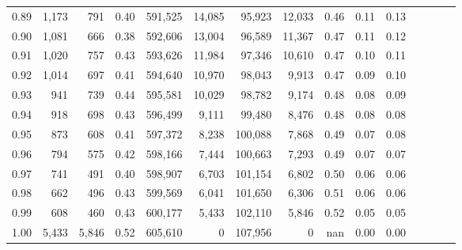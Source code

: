 \begin{tabular}{rrrcrrrrrrrrrrr}
0.89 &   1,173 &    791 &                                       0.40 &  591,525 &   14,085 &   95,923 &   12,033 &  0.46 &  0.11 &                         0.13 \\
0.90 &   1,081 &    666 &                                       0.38 &  592,606 &   13,004 &   96,589 &   11,367 &  0.47 &  0.11 &                         0.12 \\
0.91 &   1,020 &    757 &                                       0.43 &  593,626 &   11,984 &   97,346 &   10,610 &  0.47 &  0.10 &                         0.11 \\
0.92 &   1,014 &    697 &                                       0.41 &  594,640 &   10,970 &   98,043 &    9,913 &  0.47 &  0.09 &                         0.10 \\
0.93 &     941 &    739 &                                       0.44 &  595,581 &   10,029 &   98,782 &    9,174 &  0.48 &  0.08 &                         0.09 \\
0.94 &     918 &    698 &                                       0.43 &  596,499 &    9,111 &   99,480 &    8,476 &  0.48 &  0.08 &                         0.08 \\
0.95 &     873 &    608 &                                       0.41 &  597,372 &    8,238 &  100,088 &    7,868 &  0.49 &  0.07 &                         0.08 \\
0.96 &     794 &    575 &                                       0.42 &  598,166 &    7,444 &  100,663 &    7,293 &  0.49 &  0.07 &                         0.07 \\
0.97 &     741 &    491 &                                       0.40 &  598,907 &    6,703 &  101,154 &    6,802 &  0.50 &  0.06 &                         0.06 \\
0.98 &     662 &    496 &                                       0.43 &  599,569 &    6,041 &  101,650 &    6,306 &  0.51 &  0.06 &                         0.06 \\
0.99 &     608 &    460 &                                       0.43 &  600,177 &    5,433 &  102,110 &    5,846 &  0.52 &  0.05 &                         0.05 \\
1.00 &   5,433 &  5,846 &                                       0.52 &  605,610 &        0 &  107,956 &        0 &   nan &  0.00 &                         0.00 \\
\bottomrule
\end{tabular}

